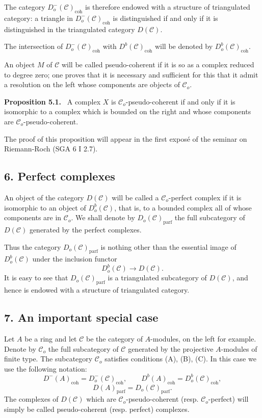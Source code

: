 \documentclass[11pt]{article}
\newenvironment{statement}[1]{\par\medskip\noindent\textbf{#1.}\ }{\par\medskip}
\providecommand{\parf}{\mathrm{parf}}
\providecommand{\coh}{\mathrm{coh}}
\providecommand{\cC}{\mathcal C}
\providecommand{\cC}{\mathcal C}
\providecommand{\parf}{\mathrm{parf}}
\providecommand{\coh}{\mathrm{coh}}
\begin{document}
The category $D_o^-(\cC)_{\coh}$ is therefore endowed with a structure of triangulated category: a triangle in $D_o^-(\cC)_{\coh}$ is distinguished if and only if it is distinguished in the triangulated category $D(\cC)$.

The intersection of $D_o^-(\cC)_{\coh}$ with $D^b(\cC)_{\coh}$ will be denoted by $D_o^b(\cC)_{\coh}$.

An object $M$ of $\cC$ will be called pseudo-coherent if it is so as a complex reduced to degree zero; one proves that it is necessary and sufficient for this that it admit a resolution on the left whose components are objects of $\cC_o$.

\begin{statement}{Proposition 5.1}
A complex $X$ is $\cC_o$-pseudo-coherent if and only if it is isomorphic to a complex which is bounded on the right and whose components are $\cC_o$-pseudo-coherent.
\end{statement}

The proof of this proposition will appear in the first exposé of the seminar on Riemann-Roch (SGA 6 I 2.7).

\subsection*{6. Perfect complexes}

An object of the category $D(\cC)$ will be called a $\cC_o$-perfect complex if it is isomorphic to an object of $D_o^b(\cC)$, that is, to a bounded complex all of whose components are in $\cC_o$. We shall denote by $D_o(\cC)_{\parf}$ the full subcategory of $D(\cC)$ generated by the perfect complexes.

Thus the category $D_o(\cC)_{\parf}$ is nothing other than the essential image of $D_o^b(\cC)$ under the inclusion functor
\[
D_o^b(\cC)\longrightarrow D(\cC).
\]
It is easy to see that $D_o(\cC)_{\parf}$ is a triangulated subcategory of $D(\cC)$, and hence is endowed with a structure of triangulated category.

\subsection*{7. An important special case}

Let $A$ be a ring and let $\cC$ be the category of $A$-modules, on the left for example. Denote by $\cC_o$ the full subcategory of $\cC$ generated by the projective $A$-modules of finite type. The subcategory $\cC_o$ satisfies conditions (A), (B), (C). In this case we use the following notation:
\[
D^-(A)_{\coh}=D_o^-(\cC)_{\coh},\qquad
D^b(A)_{\coh}=D_o^b(\cC)_{\coh},
\]
\[
D(A)_{\parf}=D_o(\cC)_{\parf}.
\]
The complexes of $D(\cC)$ which are $\cC_o$-pseudo-coherent (resp. $\cC_o$-perfect) will simply be called pseudo-coherent (resp. perfect) complexes.
\end{document}
